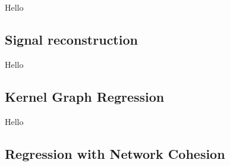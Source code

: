 Hello

\subsection{Signal reconstruction}

Hello

\subsection{Kernel Graph Regression}

Hello

\subsection{Regression with Network Cohesion}


